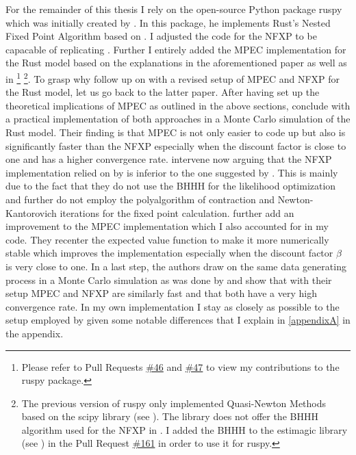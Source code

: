 For the remainder of this thesis I rely on the open-source Python package ruspy which was initially created by \cite{Blesch.2019}. In this package, he implements Rust's Nested Fixed Point Algorithm based on \cite{Rust.2000}. I adjusted the code for the NFXP to be capacable of replicating \cite{Iskhakov.2016}. Further I entirely added the MPEC implementation for the Rust model based on the explanations in the aforementioned paper as well as in \cite{Su.Judd.2012} \footnote{Please refer to Pull Requests \href{https://github.com/OpenSourceEconomics/ruspy/pull/46}{\#46} and \href{https://github.com/OpenSourceEconomics/ruspy/pull/47}{\#47} to view my contributions to the ruspy package.} \footnote{The previous version of ruspy only implemented Quasi-Newton Methods based on the scipy library (see \cite{scipy.2020}). The library does not offer the BHHH algorithm used for the NFXP in \cite{Iskhakov.2016}. I added the BHHH to the estimagic library (see \cite{Gabler.2019}) in the Pull Request \href{https://github.com/OpenSourceEconomics/estimagic/pull/161}{\#161} in order to use it for ruspy.}. To grasp why \citeauthor{Iskhakov.2016} follow up on \citeauthor{Su.Judd.2012} with a revised setup of MPEC and NFXP for the Rust model, let us go back to the latter paper. After having set up the theoretical implications of MPEC as outlined in the above sections, \citeauthor{Su.Judd.2012} conclude with a practical implementation of both approaches in a Monte Carlo simulation of the Rust model. Their finding is that MPEC is not only easier to code up but also is significantly faster than the NFXP especially when the discount factor is close to one and has a higher convergence rate. \citeauthor{Iskhakov.2016} intervene now arguing that the NFXP implementation relied on by \citeauthor{Su.Judd.2012} is inferior to the one suggested by \cite{Rust.2000}. This is mainly due to the fact that they do not use the BHHH for the likelihood optimization and further do not employ the polyalgorithm of contraction and Newton-Kantorovich iterations for the fixed point calculation. \citeauthor{Iskhakov.2016} further add an improvement to the MPEC implementation which I also accounted for in my code. They recenter the expected value function to make it more numerically stable which improves the implementation especially when the discount factor $\beta$ is very close to one. In a last step, the authors draw on the same data generating process in a Monte Carlo simulation as was done by \citeauthor{Su.Judd.2012} and show that with their setup MPEC and NFXP are similarly fast and that both have a very high convergence rate. In my own implementation I stay as closely as possible to the setup employed by \citeauthor{Iskhakov.2016} given some notable differences that I explain in \ref{appendixA} in the appendix.

